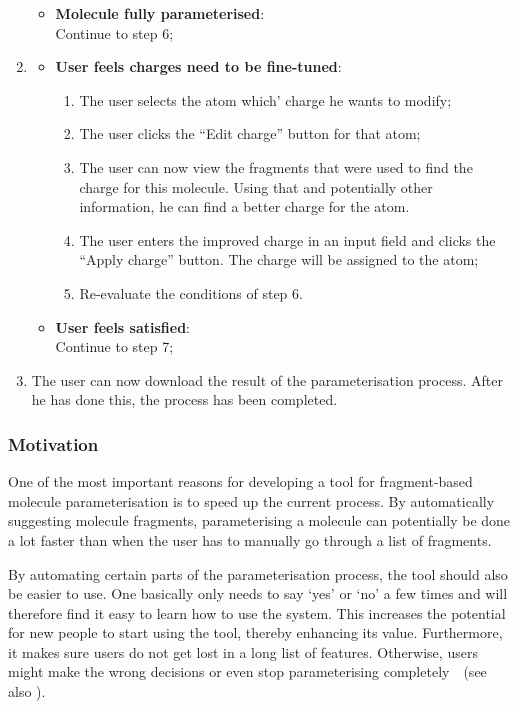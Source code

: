 \begin{enumerate}[itemsep=.1em, parsep=.2em, topsep=0em]
\begin{itemize}[leftmargin=0cm, itemsep=.1em, parsep=.1em]
  \item[] {\bf Molecule fully parameterised}:\\Continue to step 6;
  \end{itemize}
\item
  \begin{itemize}[leftmargin=0cm, itemsep=.1em, parsep=.1em]
  \item[] {\bf User feels charges need to be fine-tuned}:
    \begin{enumerate}
    \item The user selects the atom which' charge he wants to modify;
    \item The user clicks the ``Edit charge'' button for that atom;
    \item The user can now view the fragments that were used to find the charge for this molecule. Using that and potentially other information, he can find a better charge for the atom.
    \item The user enters the improved charge in an input field and clicks the ``Apply charge'' button. The charge will be assigned to the atom;
    \item Re-evaluate the conditions of step 6.
    \end{enumerate}
  \item[]{\bf User feels satisfied}:\\Continue to step 7;
  \end{itemize}
\item The user can now download the result of the parameterisation process. After he has done this, the process has been completed.
\end{enumerate}

\subsubsection{Motivation}
One of the most important reasons for developing a tool for fragment-based molecule parameterisation is to speed up the current process. By automatically suggesting molecule fragments, parameterising a molecule can potentially be done a lot faster than when the user has to manually go through a list of fragments.

By automating certain parts of the parameterisation process, the tool should also be easier to use. One basically only needs to say `yes' or `no' a few times and will therefore find it easy to learn how to use the system. This increases the potential for new people to start using the tool, thereby enhancing its value. Furthermore, it makes sure users do not get lost in a long list of features. Otherwise, users might make the wrong decisions or even stop parameterising completely~\cite{norman2002design}~(see also ).

